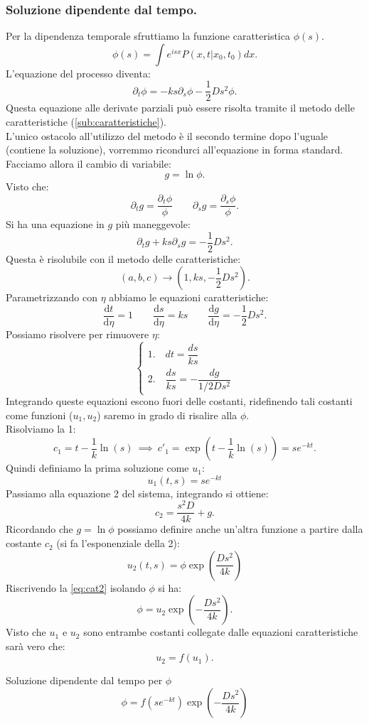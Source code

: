 \subsubsection{Soluzione dipendente dal tempo.}%
\label{subsub:Soluzione dipendente dal tempo}
Per la dipendenza temporale sfruttiamo la funzione caratteristica $\phi (s)$.
\[
    \phi (s) = \int e^{isx}P(x,t|x_0,t_0) dx
.\] 
L'equazione del processo diventa:
\[
    \partial_{t}\phi  = -ks\partial_{s}\phi  - \frac{1}{2}Ds^2\phi
.\] 
Questa equazione alle derivate parziali può essere risolta tramite il metodo delle caratteristiche (\ref{sub:caratteristiche}).\\
L'unico ostacolo all'utilizzo del metodo è il secondo termine dopo l'uguale (contiene la soluzione), vorremmo ricondurci all'equazione in forma standard. \\
Facciamo allora il cambio di variabile:
\[
    g = \ln\phi 
.\] 
Visto che:
\[
     \partial_{t}g =\frac{\partial_{t}\phi}{\phi} \qquad 
     \partial_{s}g = \frac{\partial_{s}\phi}{\phi}
.\] 
Si ha una equazione in $g$ più maneggevole:
\[
    \partial_{t}g + k s \partial_{s}g = -\frac{1}{2}Ds^2
.\] 
Questa è risolubile con il metodo delle caratteristiche: 
\[
    (a, b, c) \to (1, ks, -\frac{1}{2}Ds^2) 
.\] 
Parametrizzando con $\eta$ abbiamo le equazioni caratteristiche:
\[
        \frac{\text{d} t}{\text{d} \eta} = 1 
	\qquad
	\frac{\text{d} s}{\text{d} \eta} = ks 
	\qquad
	\frac{\text{d} g}{\text{d} \eta} = -\frac{1}{2}D s^2
.\] 
Possiamo risolvere per rimuovere $\eta$:
\[
    \begin{cases}
        1. \quad dt = \dfrac{ds}{ks}\\
	2. \quad \dfrac{ds}{ks} = - \dfrac{dg}{1 / 2 Ds^2}
    \end{cases}
\] 
Integrando queste equazioni escono fuori delle costanti, ridefinendo tali costanti come funzioni ($u_1,u_2$) saremo in grado di risalire alla $\phi$.\\ 
Risolviamo la 1:
\[
    c_1 = t - \frac{1}{k}\ln (s) \ \implies  \ c'_1 = \exp\left(t- \frac{1}{k}\ln (s) \right) = s e^{-kt}
.\] 
Quindi definiamo la prima soluzione come $u_1$:
\begin{equation}
    u_1(t,s) = s e^{-kt} \label{eq:cat1}
\end{equation}
Passiamo alla equazione 2 del sistema, integrando si ottiene:
\[
    c_2 = \frac{s^2D}{4k} + g 
.\] 
Ricordando che $g=\ln\phi$ possiamo definire anche un'altra funzione a partire dalla costante $c_2$ (si fa l'esponenziale della 2):
\begin{equation}
    u_2(t,s) = \phi \exp\left(\frac{Ds^2}{4k}\right) \label{eq:cat2}
\end{equation}
Riscrivendo la \ref{eq:cat2} isolando $\phi$ si ha:
\[
    \phi  = u_2 \exp\left(-\frac{Ds^2}{4k}\right)
.\]
Visto che $u_1$ e $u_2$ sono entrambe costanti collegate dalle equazioni caratteristiche sarà vero che:
\[
    u_2 = f(u_1) 
.\] 
\begin{redbox}{Soluzione dipendente dal tempo per $\phi$}
    \begin{equation}
    \phi =f\left(se^{-kt}\right)\exp\left(-\frac{Ds^2}{4k}\right) 
    \label{eq:car_phi}
    \end{equation}
\end{redbox}
\noindent
